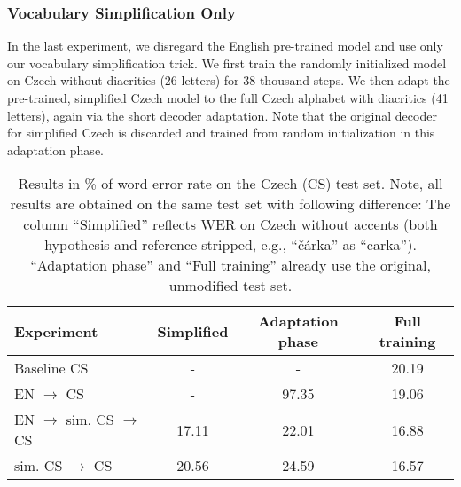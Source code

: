 \subsubsection{Vocabulary Simplification Only}
\label{sub_sec:simplification}





In the last experiment, we disregard the English pre-trained model and use only our vocabulary simplification trick. We first train the randomly initialized model on Czech without diacritics (26 letters) for 38 thousand steps. We then adapt the pre-trained, simplified Czech model to the full Czech alphabet with diacritics (41 letters), again via the short decoder adaptation. Note that the original decoder for simplified Czech is discarded and trained from random initialization in this adaptation phase.



\begin{table}[t]
	\small\centering
	\begin{tabular}{lc|cc}
		\bf Experiment & \bf Simplified & \bf Adaptation phase & \bf Full training \\
		\hline
		Baseline CS & - &  - &  20.19 \\
		EN $\rightarrow$ CS & -  & 97.35 &  19.06  \\
		EN $\rightarrow$ sim. CS $\rightarrow$ CS & 17.11  & 22.01 &  16.88 \\
		sim. CS $\rightarrow$ CS & 20.56  &  24.59 &  16.57  \\
	\end{tabular}
	\caption{Results in \% of word error rate on the Czech (CS) test set. Note, all results are obtained on the same test set with following difference: The column ``Simplified'' reflects WER on Czech without accents (both hypothesis and reference stripped, e.g., ``\v{c}\'arka'' as ``carka''). ``Adaptation phase'' and ``Full training'' already use the original, unmodified test set.}
	\label{tab:results}
\end{table}


